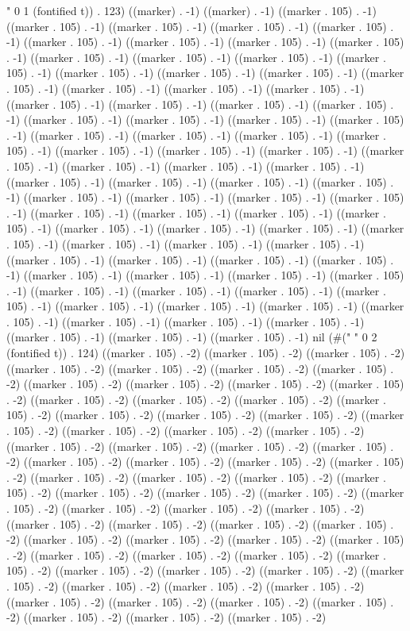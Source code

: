 " 0 1 (fontified t)) . 123) ((marker) . -1) ((marker) . -1) ((marker . 105) . -1) ((marker . 105) . -1) ((marker . 105) . -1) ((marker . 105) . -1) ((marker . 105) . -1) ((marker . 105) . -1) ((marker . 105) . -1) ((marker . 105) . -1) ((marker . 105) . -1) ((marker . 105) . -1) ((marker . 105) . -1) ((marker . 105) . -1) ((marker . 105) . -1) ((marker . 105) . -1) ((marker . 105) . -1) ((marker . 105) . -1) ((marker . 105) . -1) ((marker . 105) . -1) ((marker . 105) . -1) ((marker . 105) . -1) ((marker . 105) . -1) ((marker . 105) . -1) ((marker . 105) . -1) ((marker . 105) . -1) ((marker . 105) . -1) ((marker . 105) . -1) ((marker . 105) . -1) ((marker . 105) . -1) ((marker . 105) . -1) ((marker . 105) . -1) ((marker . 105) . -1) ((marker . 105) . -1) ((marker . 105) . -1) ((marker . 105) . -1) ((marker . 105) . -1) ((marker . 105) . -1) ((marker . 105) . -1) ((marker . 105) . -1) ((marker . 105) . -1) ((marker . 105) . -1) ((marker . 105) . -1) ((marker . 105) . -1) ((marker . 105) . -1) ((marker . 105) . -1) ((marker . 105) . -1) ((marker . 105) . -1) ((marker . 105) . -1) ((marker . 105) . -1) ((marker . 105) . -1) ((marker . 105) . -1) ((marker . 105) . -1) ((marker . 105) . -1) ((marker . 105) . -1) ((marker . 105) . -1) ((marker . 105) . -1) ((marker . 105) . -1) ((marker . 105) . -1) ((marker . 105) . -1) ((marker . 105) . -1) ((marker . 105) . -1) ((marker . 105) . -1) ((marker . 105) . -1) ((marker . 105) . -1) ((marker . 105) . -1) ((marker . 105) . -1) ((marker . 105) . -1) ((marker . 105) . -1) ((marker . 105) . -1) ((marker . 105) . -1) ((marker . 105) . -1) ((marker . 105) . -1) ((marker . 105) . -1) ((marker . 105) . -1) ((marker . 105) . -1) ((marker . 105) . -1) ((marker . 105) . -1) ((marker . 105) . -1) ((marker . 105) . -1) ((marker . 105) . -1) ((marker . 105) . -1) nil (#("  " 0 2 (fontified t)) . 124) ((marker . 105) . -2) ((marker . 105) . -2) ((marker . 105) . -2) ((marker . 105) . -2) ((marker . 105) . -2) ((marker . 105) . -2) ((marker . 105) . -2) ((marker . 105) . -2) ((marker . 105) . -2) ((marker . 105) . -2) ((marker . 105) . -2) ((marker . 105) . -2) ((marker . 105) . -2) ((marker . 105) . -2) ((marker . 105) . -2) ((marker . 105) . -2) ((marker . 105) . -2) ((marker . 105) . -2) ((marker . 105) . -2) ((marker . 105) . -2) ((marker . 105) . -2) ((marker . 105) . -2) ((marker . 105) . -2) ((marker . 105) . -2) ((marker . 105) . -2) ((marker . 105) . -2) ((marker . 105) . -2) ((marker . 105) . -2) ((marker . 105) . -2) ((marker . 105) . -2) ((marker . 105) . -2) ((marker . 105) . -2) ((marker . 105) . -2) ((marker . 105) . -2) ((marker . 105) . -2) ((marker . 105) . -2) ((marker . 105) . -2) ((marker . 105) . -2) ((marker . 105) . -2) ((marker . 105) . -2) ((marker . 105) . -2) ((marker . 105) . -2) ((marker . 105) . -2) ((marker . 105) . -2) ((marker . 105) . -2) ((marker . 105) . -2) ((marker . 105) . -2) ((marker . 105) . -2) ((marker . 105) . -2) ((marker . 105) . -2) ((marker . 105) . -2) ((marker . 105) . -2) ((marker . 105) . -2) ((marker . 105) . -2) ((marker . 105) . -2) ((marker . 105) . -2) ((marker . 105) . -2) ((marker . 105) . -2) ((marker . 105) . -2) ((marker . 105) . -2) ((marker . 105) . -2) ((marker . 105) . -2) ((marker . 105) . -2) ((marker . 105) . -2) ((marker . 105) . -2) ((marker . 105) . -2) ((marker . 105) . -2) 